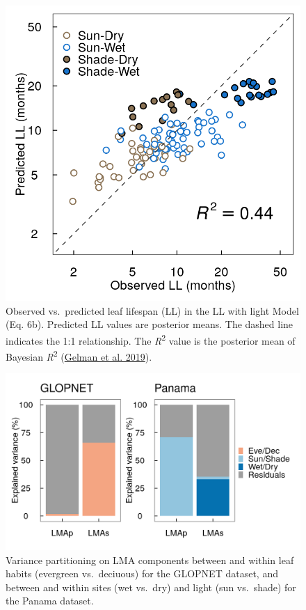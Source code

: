 \documentclass[
  12pt,
  a4paper,
,tablecaptionabove
]{scrartcl}
\begin{document}
\begin{figure}

{\centering \includegraphics{../figs/pa_point_ll.png}

}

\caption{\label{fig-LLplt}Observed vs.~predicted leaf lifespan (LL) in
the LL with light Model (Eq. 6b). Predicted LL values are posterior
means. The dashed line indicates the 1:1 relationship. The
\emph{R}\textsuperscript{2} value is the posterior mean of Bayesian
\emph{R}\textsuperscript{2} (\protect\hyperlink{ref-Gelman2019}{Gelman
et al. 2019}).}

\end{figure}

\newpage

\begin{figure}

{\centering \includegraphics{../figs/vpart.png}

}

\caption{\label{fig-vpart}Variance partitioning on LMA components
between and within leaf habits (evergreen vs.~deciuous) for the GLOPNET
dataset, and between and within sites (wet vs.~dry) and light (sun
vs.~shade) for the Panama dataset.}

\end{figure}
\end{document}
